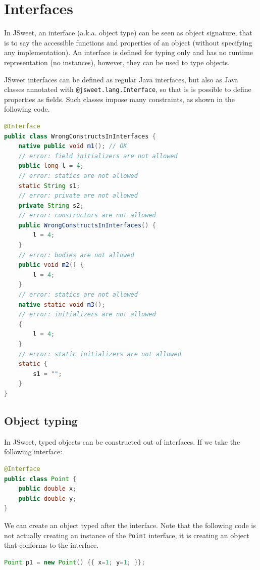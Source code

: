 \documentclass[a4paper]{report}
\begin{document}
\section{Interfaces}

In JSweet, an interface (a.k.a. object type) can be seen as object signature, that is to say the accessible functions and properties of an object (without specifying any implementation). An interface is defined for typing only and has no runtime representation (no instances), however, they can be used to type objects.

JSweet interfaces can be defined as regular Java interfaces, but also as Java classes annotated with \texttt{@jsweet.lang.Interface}, so that is is possible to define properties as fields. Such classes impose many constraints, as shown in the following code.

\begin{lstlisting}[language=Java]
@Interface
public class WrongConstructsInInterfaces {
	native public void m1(); // OK
	// error: field initializers are not allowed
	public long l = 4;
	// error: statics are not allowed
	static String s1;
	// error: private are not allowed
	private String s2;
	// error: constructors are not allowed
	public WrongConstructsInInterfaces() {
		l = 4;
	}
	// error: bodies are not allowed
	public void m2() {
		l = 4;
	}
	// error: statics are not allowed
	native static void m3();
	// error: initializers are not allowed
	{
		l = 4;
	}
	// error: static initializers are not allowed
	static {
		s1 = "";
	}
}
\end{lstlisting}

\subsection{Object typing}

In JSweet, typed objects can be constructed out of interfaces. If we take the following interface:

\begin{lstlisting}[language=Java]
@Interface
public class Point {
	public double x;
	public double y;
}
\end{lstlisting}

\noindent
We can create an object typed after the interface. Note that the following code is not actually creating an instance of the \texttt{Point} interface, it is creating an object that conforms to the interface. 

\begin{lstlisting}[language=Java]
Point p1 = new Point() {{ x=1; y=1; }};
\end{lstlisting}
\end{document}
